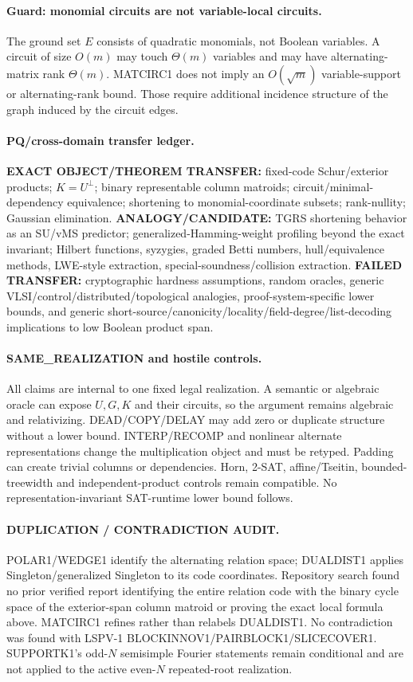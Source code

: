\documentclass[11pt]{article}
\begin{document}
\paragraph{Guard: monomial circuits are not variable-local circuits.}
The ground set \(E\) consists of quadratic monomials, not Boolean variables. A circuit of size \(O(m)\) may touch \(\Theta(m)\) variables and may have alternating-matrix rank \(\Theta(m)\). MATCIRC1 does not imply an \(O(\sqrt m)\) variable-support or alternating-rank bound. Those require additional incidence structure of the graph induced by the circuit edges.

\paragraph{PQ/cross-domain transfer ledger.}
\textbf{EXACT OBJECT/THEOREM TRANSFER:} fixed-code Schur/exterior products; \(K=U^\perp\); binary representable column matroids; circuit/minimal-dependency equivalence; shortening to monomial-coordinate subsets; rank-nullity; Gaussian elimination.
\textbf{ANALOGY/CANDIDATE:} TGRS shortening behavior as an SU/vMS predictor; generalized-Hamming-weight profiling beyond the exact invariant; Hilbert functions, syzygies, graded Betti numbers, hull/equivalence methods, LWE-style extraction, special-soundness/collision extraction.
\textbf{FAILED TRANSFER:} cryptographic hardness assumptions, random oracles, generic VLSI/control/distributed/topological analogies, proof-system-specific lower bounds, and generic short-source/canonicity/locality/field-degree/list-decoding implications to low Boolean product span.

\paragraph{SAME\_REALIZATION and hostile controls.}
All claims are internal to one fixed legal realization. A semantic or algebraic oracle can expose \(U,G,K\) and their circuits, so the argument remains algebraic and relativizing. DEAD/COPY/DELAY may add zero or duplicate structure without a lower bound. INTERP/RECOMP and nonlinear alternate representations change the multiplication object and must be retyped. Padding can create trivial columns or dependencies. Horn, 2-SAT, affine/Tseitin, bounded-treewidth and independent-product controls remain compatible. No representation-invariant SAT-runtime lower bound follows.

\paragraph{DUPLICATION / CONTRADICTION AUDIT.}
POLAR1/WEDGE1 identify the alternating relation space; DUALDIST1 applies Singleton/generalized Singleton to its code coordinates. Repository search found no prior verified report identifying the entire relation code with the binary cycle space of the exterior-span column matroid or proving the exact local formula above. MATCIRC1 refines rather than relabels DUALDIST1. No contradiction was found with LSPV-1 BLOCKINNOV1/PAIRBLOCK1/SLICECOVER1. SUPPORTK1's odd-\(N\) semisimple Fourier statements remain conditional and are not applied to the active even-\(N\) repeated-root realization.
\end{document}
